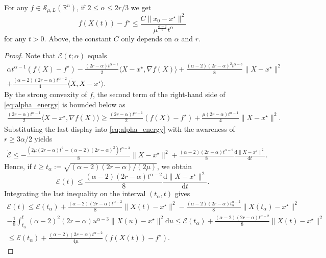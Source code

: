 \documentclass[twoside,11pt]{article}
\newcommand{\R}{\mathbb{R}}
\newcommand{\inverse}[1]{\frac{1}{#1}}
\renewcommand{\d}{{\mathrm{d}}}
\begin{document}
\begin{theorem}\label{thm:cube_rate}
For any $f\in\mathcal{S}_{\mu,L}(\R^n)$, if $2 \le \alpha \le 2r/3$ we get
\begin{equation}\nonumber
f(X(t)) - f^\star \le \frac{C\|x_0-x^\star\|^2}{\mu^{\frac{\alpha-2}{2}}t^{\alpha}}
\end{equation}
for any $t > 0$. Above, the constant $C$ only depends on $\alpha$ and $r$.
\end{theorem}

\begin{proof}
Note that $\dot{\mathcal{E}}(t; \alpha)$ equals
\begin{multline}\label{eq:alpha_energy}
\alpha t^{\alpha - 1}(f(X)-f^\star) - \frac{(2r-\alpha)t^{\alpha-1}}{2}\langle X- x^\star, \nabla f(X)\rangle + \frac{(\alpha-2)(2r-\alpha)^2t^{\alpha-3}}{8}\|X-x^\star\|^2 \\+ \frac{(\alpha-2)(2r-\alpha)t^{\alpha-2}}{4}\langle \dot X, X - x^\star\rangle.
\end{multline}
By the strong convexity of $f$, the second term of the right-hand side of \eqref{eq:alpha_energy} is bounded below as
\begin{equation}\nonumber
\begin{aligned}
\frac{(2r-\alpha)t^{\alpha-1}}{2}\langle X- x^\star, \nabla f(X)\rangle \geq \frac{(2r-\alpha)t^{\alpha-1}}{2}(f(X) -f^\star) + \frac{\mu(2r-\alpha)t^{\alpha-1}}{4}\|X-x^\star\|^2.
\end{aligned}
\end{equation}
Substituting the last display  into \eqref{eq:alpha_energy} with the awareness of $r \geq 3\alpha/2$ yields
\begin{multline}\nonumber
\dot{\mathcal{E}} \le -  \frac{(2\mu(2r-\alpha)t^2 - (\alpha-2)(2r-\alpha)^2)t^{\alpha-3}}{8}\|X-x^\star\|^2 + \frac{(\alpha-2)(2r-\alpha)t^{\alpha-2}}{8}\frac{\d\|X-x^\star\|^2}{\d t}.
\end{multline}
Hence, if $t \geq t_{\alpha} :=  \sqrt{(\alpha-2)(2r-\alpha)/(2\mu)}$, we obtain
\begin{equation}\nonumber%
\dot{\mathcal{E}}(t) \le
\frac{(\alpha-2)(2r-\alpha)t^{\alpha-2}}{8}\frac{\d\|X-x^\star\|^2}{\d t}.
\end{equation}
Integrating the last inequality on the interval $(t_{\alpha}, t)$ gives
\begin{multline}\label{eq:bound_tilde_energy}
\mathcal{E}(t) \le \mathcal{E}(t_{\alpha}) + 
\frac{(\alpha-2)(2r-\alpha)t^{\alpha-2}}{8}\|X(t)-x^\star\|^2 - \frac{(\alpha-2)(2r-\alpha)t_{\alpha}^{\alpha-2}}{8}\|X(t_{\alpha})-x^\star\|^2 \\- \inverse{8}\int^t_{t_{\alpha}}(\alpha-2)^2(2r-\alpha)u^{\alpha-3}\|X(u)-x^\star\|^2\d u
\le \mathcal{E}(t_{\alpha}) + 
\frac{(\alpha-2)(2r-\alpha)t^{\alpha-2}}{8}\|X(t)-x^\star\|^2\\
\le \mathcal{E}(t_{\alpha}) + 
\frac{(\alpha-2)(2r-\alpha)t^{\alpha-2}}{4\mu}(f(X(t)) - f^\star).
\end{multline}


\end{proof}
\end{document}
